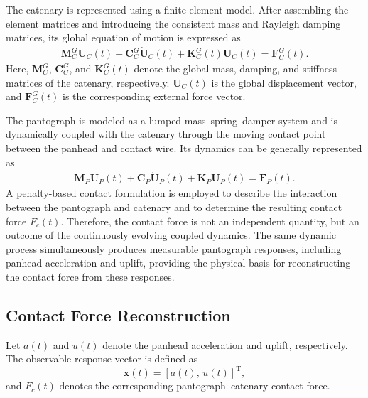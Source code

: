 \documentclass[journal,twoside]{IEEEtran}
\begin{document}
The catenary is represented using a finite-element model. After assembling the
element matrices and introducing the consistent mass and Rayleigh damping
matrices, its global equation of motion is expressed as
\begin{equation}
\begin{aligned}
    \mathbf{M}_{C}^{G}\ddot{\mathbf{U}}_{C}(t)
    +\mathbf{C}_{C}^{G}\dot{\mathbf{U}}_{C}(t)
    +\mathbf{K}_{C}^{G}(t)\mathbf{U}_{C}(t)
    =\mathbf{F}_{C}^{G}(t).
\end{aligned}
\label{eq:catenary_dynamics}
\end{equation}
Here, $\mathbf{M}_{C}^{G}$, $\mathbf{C}_{C}^{G}$, and
$\mathbf{K}_{C}^{G}(t)$ denote the global mass, damping, and stiffness
matrices of the catenary, respectively. $\mathbf{U}_{C}(t)$ is the global
displacement vector, and $\mathbf{F}_{C}^{G}(t)$ is the corresponding
external force vector.

The pantograph is modeled as a lumped mass--spring--damper system and is
dynamically coupled with the catenary through the moving contact point between
the panhead and contact wire. Its dynamics can be generally represented as
\begin{equation}
\begin{aligned}
    \mathbf{M}_{P}\ddot{\mathbf{U}}_{P}(t)
    +\mathbf{C}_{P}\dot{\mathbf{U}}_{P}(t)
    +\mathbf{K}_{P}\mathbf{U}_{P}(t)
    =\mathbf{F}_{P}(t).
\end{aligned}
\label{eq:pantograph_dynamics}
\end{equation}
A penalty-based contact formulation is employed to describe the interaction
between the pantograph and catenary and to determine the resulting contact
force $F_c(t)$. Therefore, the contact force is not an independent quantity,
but an outcome of the continuously evolving coupled dynamics. The same
dynamic process simultaneously produces measurable pantograph responses,
including panhead acceleration and uplift, providing the physical basis for
reconstructing the contact force from these responses.

\subsection{Contact Force Reconstruction}

Let $a(t)$ and $u(t)$ denote the panhead acceleration and uplift,
respectively. The observable response vector is defined as
\begin{equation}
    \mathbf{x}(t)
    =
    \left[
    a(t),\,u(t)
    \right]^{\mathrm T},
    \label{eq:observation}
\end{equation}
and $F_c(t)$ denotes the corresponding pantograph--catenary contact force.
\end{document}
